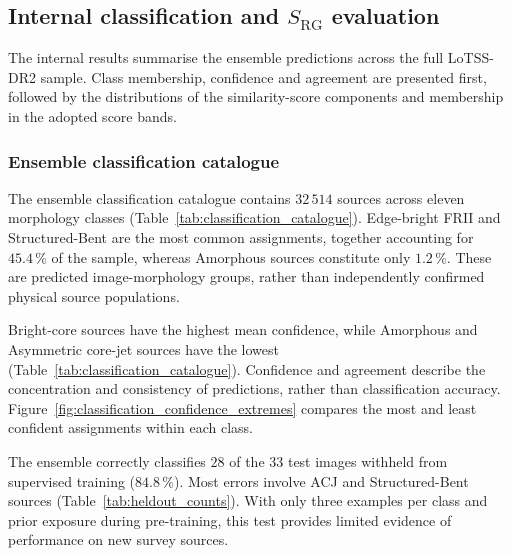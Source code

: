 \subsection{Internal classification and \texorpdfstring{$S_\mathrm{RG}$}{S\_RG} evaluation}
\label{sec:results_internal}

The internal results summarise the ensemble predictions across the full LoTSS-DR2 sample. Class membership, confidence and agreement are presented first, followed by the distributions of the similarity-score components and membership in the adopted score bands.

\subsubsection{Ensemble classification catalogue}
\label{sec:results_classification}

The ensemble classification catalogue contains \(32\,514\) sources across eleven morphology classes (Table~\ref{tab:classification_catalogue}). Edge-bright FRII and Structured-Bent are the most common assignments, together accounting for \(45.4\,\%\) of the sample, whereas Amorphous sources constitute only \(1.2\,\%\). These are predicted image-morphology groups, rather than independently confirmed physical source populations.

Bright-core sources have the highest mean confidence, while Amorphous and Asymmetric core-jet sources have the lowest (Table~\ref{tab:classification_catalogue}). Confidence and agreement describe the concentration and consistency of predictions, rather than classification accuracy. Figure~\ref{fig:classification_confidence_extremes} compares the most and least confident assignments within each class.

The ensemble correctly classifies \(28\) of the \(33\) test images withheld from supervised training (\(84.8\,\%\)). Most errors involve ACJ and Structured-Bent sources (Table~\ref{tab:heldout_counts}). With only three examples per class and prior exposure during pre-training, this test provides limited evidence of performance on new survey sources.

